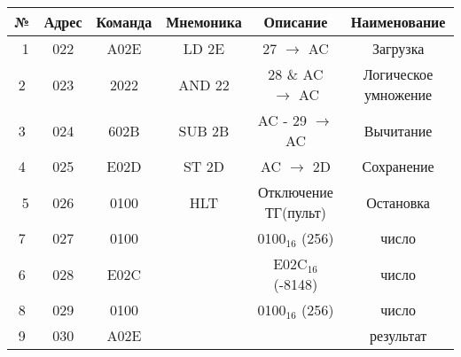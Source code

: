 \renewcommand{\ra}{\rightarrow}
\renewcommand{\tb}{\textbf}
\begin{table}[H]
  \small
  \centering
  \begin{tabular}{|c|c|c|c|c|c|}
  \hline
№  & \tb{Адрес}&\tb{Команда}&\tb{Мнемоника}& \tb{Описание} & \tb{Наименование} \\ \hline \cellcolor{gray!25}  \
1 & 022    &  A02E     & LD 2E         & 27 $\ra$ AC          & Загрузка \\ \hline 
2 & 023    &  2022     & AND 22        & 28 \& AC $\ra$ AC    & Логическое умножение \\ \hline
3 & 024    &  602B     & SUB 2B        & AC - 29 $\ra$ AC     & Вычитание \\ \hline
4 & 025    &  E02D     & ST 2D         &  AC $\ra$ 2D         & Сохранение \\ \hline \cellcolor{gray!25}  \
5 & 026    &  0100     & HLT           & Отключение ТГ(пульт) & Остановка \\ \hline 
7 & 027    &  0100     &               &  0100$_{16}$ (256)          & число \\ \hline
6 & 028    &  E02C     &               &  E02C$_{16}$ (-8148) & число \\ \hline 
8 & 029    &  0100     &               &  0100$_{16}$ (256)          & число \\ \hline
9 & 030    &  A02E     &               &                         & результат \\ \hline
  \end{tabular}
\end{table}